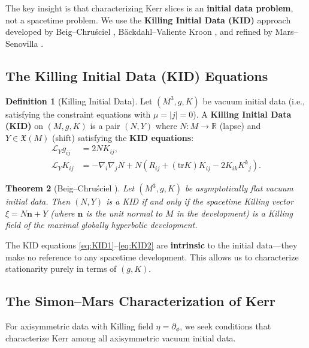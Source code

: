 \documentclass[12pt]{article}
\theoremstyle{plain}
\newtheorem{theorem}{Theorem}[section]
\theoremstyle{definition}
\newtheorem{definition}[theorem]{Definition}
\theoremstyle{remark}
\newcommand{\tr}{\mathrm{tr}}
\begin{document}
The key insight is that characterizing Kerr slices is an \textbf{initial data problem}, not a spacetime problem. We use the \textbf{Killing Initial Data (KID)} approach developed by Beig--Chru\'sciel \cite{beigchrusciel1996}, B\"ackdahl--Valiente Kroon \cite{backdahl2010a, backdahl2010b}, and refined by Mars--Senovilla \cite{marssenovilla1993}.

\subsection{The Killing Initial Data (KID) Equations}

\begin{definition}[Killing Initial Data]\label{def:KID}
Let $(M^3, g, K)$ be vacuum initial data (i.e., satisfying the constraint equations with $\mu = |j| = 0$). A \textbf{Killing Initial Data (KID)} on $(M, g, K)$ is a pair $(N, Y)$ where $N: M \to \mathbb{R}$ (lapse) and $Y \in \mathfrak{X}(M)$ (shift) satisfying the \textbf{KID equations}:
\begin{align}
\mathcal{L}_Y g_{ij} &= 2NK_{ij}, \label{eq:KID1}\\
\mathcal{L}_Y K_{ij} &= -\nabla_i\nabla_j N + N(R_{ij} + (\tr K)K_{ij} - 2K_{ik}K^k{}_j). \label{eq:KID2}
\end{align}
\end{definition}

\begin{theorem}[Beig--Chru\'sciel \cite{beigchrusciel1996}]\label{thm:KID-spacetime}
Let $(M^3, g, K)$ be asymptotically flat vacuum initial data. Then $(N, Y)$ is a KID if and only if the spacetime Killing vector $\xi = N\mathbf{n} + Y$ (where $\mathbf{n}$ is the unit normal to $M$ in the development) is a Killing field of the maximal globally hyperbolic development.
\end{theorem}

The KID equations \eqref{eq:KID1}--\eqref{eq:KID2} are \textbf{intrinsic} to the initial data---they make no reference to any spacetime development. This allows us to characterize stationarity purely in terms of $(g, K)$.

\subsection{The Simon--Mars Characterization of Kerr}

For axisymmetric data with Killing field $\eta = \partial_\phi$, we seek conditions that characterize Kerr among all axisymmetric vacuum initial data.
\end{document}
